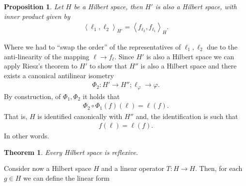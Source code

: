 \documentclass[12pt]{article}
\newtheorem{theorem}{Theorem}
\newtheorem{proposition}{Proposition}
\newcommand{\br}[1]{\left\langle#1\right\rangle} \newcommand{\set}[1]{\left\{#1\right\}}\newcommand{\qt}[1]{\left(#1\right)} \newcommand{\qp}[1]{\left(#1\right)}\newcommand{\qb}[1]{\left[#1\right]}
\begin{document}
\begin{CJK*}{UTF8}{gbsn}
	\begin{proposition}
		Let $H$ be a Hilbert space, then  $H'$ is also a Hilbert space, with inner product given by
		\begin{align*}
			\br{\ell_1 , \ell_2 }_{H'}=\br{f_{\ell _2},f_{\ell_1 }}_H.
		\end{align*}
	\end{proposition}
	Where we had to ``swap the order'' of the representatives of $\ell_1, \ell_2$ due to the anti-linearity of the mapping $\ell \to f_\ell $. Since $H'$ is also a Hilbert space we can apply Riesz's theorem to $H'$ to show that $H''$ is also a Hilbert space and there exists a canonical antilinear isometry
	\begin{align*}
		\Phi_2:  H'\to H''; \ell_\varphi \to \varphi .
	\end{align*}
	By construction, of $\Phi_1,\Phi_2$ it holds that
	\begin{align*}
		\Phi_2 \circ \Phi_1 (f) (\ell )= \ell(f).
	\end{align*}
	That is, $H$ is identified canonically with  $H''$ and, the identification is such that \begin{align*}
		f(\ell )=\ell (f).
	\end{align*}
	In other words.
	\begin{theorem}
		Every Hilbert space is reflexive.
	\end{theorem}
	Consider now a Hilbert space $H$ and a linear operator $T: H \to H$.
	Then, for each $g \in H$ we can define the linear form


\end{CJK*}
\end{document}
